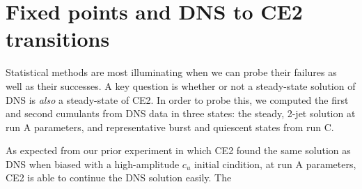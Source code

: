 \documentclass{jfm}
\newcommand{\cmark}{\ding{51}}%
\newcommand{\done}{\rlap{$\square$}{\raisebox{2pt}{\large\hspace{1pt}\cmark}}%
\hspace{-2.5pt}}
\newcommand{\cu}{c_u}
\begin{document}

\section{Fixed points and DNS to CE2 transitions}
\label{sec:fixed}
Statistical methods are most illuminating when we can probe their failures as well as their successes.
A key question is whether or not a steady-state solution of DNS is \emph{also} a steady-state of CE2.
In order to probe this, we computed the first and second cumulants from DNS data in three states: the steady, 2-jet solution at run A parameters, and representative burst and quiescent states from run C.

As expected from our prior experiment in which CE2 found the same solution as DNS when biased with a high-amplitude $\cu$ initial cindition, at run A parameters, CE2 is able to continue the DNS solution easily.
The 
\end{document}
